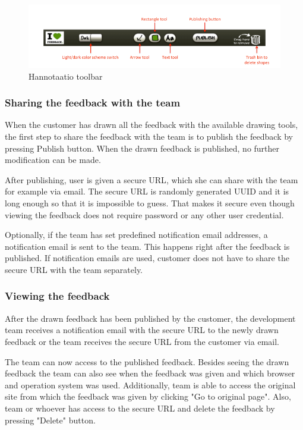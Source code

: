 \documentclass[english,12pt,a4paper,pdftex]{article}
\begin{document}
\begin{figure}[htb]
\begin{center}
\includegraphics[width=1.0\textwidth]{drawing_tools_annotated_crop.png}
\end{center}
\caption{Hannotaatio toolbar}
\label{fig:hannotaatio_toolbar}
\end{figure}

\subsubsection{Sharing the feedback with the team}

When the customer has drawn all the feedback with the available drawing tools, the first step to share the feedback with the team is to publish the feedback by pressing Publish button. When the drawn feedback is published, no further modification can be made.

After publishing, user is given a secure \ac{URL}, which she can share with the team for example via email. The secure \ac{URL} is randomly generated \ac{UUID} and it is long enough so that it is impossible to guess. That makes it secure even though viewing the feedback does not require password or any other user credential.

Optionally, if the team has set predefined notification email addresses, a notification email is sent to the team. This happens right after the feedback is published. If notification emails are used, customer does not have to share the secure \ac{URL} with the team separately.

\subsubsection{Viewing the feedback}

After the drawn feedback has been published by the customer, the development team receives a notification email with the secure \ac{URL} to the newly drawn feedback or the team receives the secure \ac{URL} from the customer via email.

The team can now access to the published feedback. Besides seeing the drawn feedback the team can also see when the feedback was given and which browser and operation system was used. Additionally, team is able to access the original site from which the feedback was given by clicking "Go to original page". Also, team or whoever has access to the secure \ac{URL} and delete the feedback by pressing "Delete" button.
\end{document}

